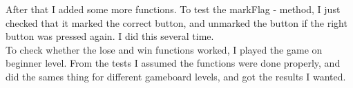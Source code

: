 \documentclass[12pt,twoside,a4paper]{article}
\begin{document}
After that I added some more functions. To test the markFlag - method, I just checked that it marked the correct button, and unmarked the button if the right button was pressed again. I did this several time. \\

To check whether the lose and win functions worked, I played the game on beginner level. From the tests I assumed the functions were done properly, and did the sames thing for different gameboard levels, and got the results I wanted.
\end{document}
